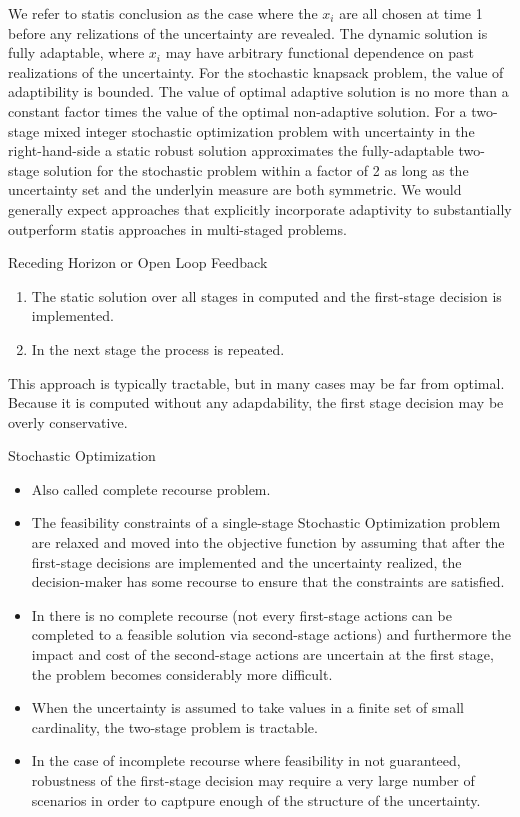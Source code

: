 \documentclass{beamer}
\begin{document}
\begin{frame}{}
We refer to statis conclusion as the case where the $x_{i}$ are all chosen at time 1 before any relizations of the uncertainty are revealed. The dynamic solution is fully adaptable, where $x_{i}$ may have arbitrary functional dependence on past realizations of the uncertainty.
For the stochastic knapsack problem, the value of adaptibility is bounded. The value of optimal adaptive solution is no more than a constant factor times the value of the optimal non-adaptive solution.
For a two-stage mixed integer stochastic optimization problem with uncertainty in the right-hand-side a static robust solution approximates the fully-adaptable two-stage solution for the stochastic problem within a factor of 2 as long as the uncertainty set and the underlyin measure are both symmetric.
We would generally expect approaches that explicitly incorporate adaptivity to substantially outperform statis approaches in multi-staged problems.
\end{frame}

\begin{frame}{Receding Horizon or Open Loop Feedback}
\begin{enumerate}
\item The static solution over all stages in computed and the first-stage decision is implemented.
\item In the next stage the process is repeated.
\end{enumerate}
This approach is typically tractable, but in many cases may be far from optimal.
Because it is computed without any adapdability, the first stage decision may be overly conservative.
\end{frame}

\begin{frame}{Stochastic Optimization}
\begin{itemize}
\item Also called complete recourse problem.
\item The feasibility constraints of a single-stage Stochastic Optimization problem are relaxed and moved into the objective function by assuming that after the first-stage decisions are implemented and the uncertainty realized, the decision-maker has some recourse to ensure that the constraints are satisfied.
\item In there is no complete recourse (not every first-stage actions can be completed to a feasible solution via second-stage actions) and furthermore the impact and cost of the second-stage actions are uncertain at the first stage, the problem becomes considerably more difficult.
\item When the uncertainty is assumed to take values in a finite set of small cardinality, the two-stage problem is tractable.
\item In the case of incomplete recourse where feasibility in not guaranteed, robustness of the first-stage decision may require a very large number of scenarios in order to captpure enough of the structure of the uncertainty.
\end{itemize}
\end{frame}
\end{document}

